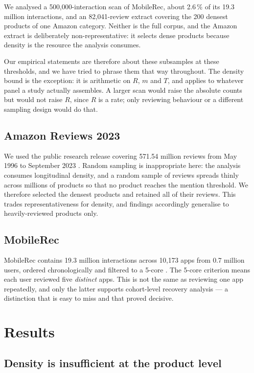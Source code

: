 \documentclass[11pt,a4paper]{article}
\makeatletter
\let\original@section\section
\renewcommand{\section}{\FloatBarrier\original@section}%
\let\original@subsection\subsection
\renewcommand{\subsection}{\FloatBarrier\original@subsection}%
\makeatother
\begin{document}
We analysed a 500{,}000-interaction scan of MobileRec, about 2.6\,\% of its
19.3 million interactions, and an 82{,}041-review extract covering the 200
densest products of one Amazon category. Neither is the full corpus, and the
Amazon extract is deliberately non-representative: it selects dense products
because density is the resource the analysis consumes.

Our empirical statements are therefore about these subsamples at these
thresholds, and we have tried to phrase them that way throughout. The density
bound is the exception: it is arithmetic on $R$, $m$ and $T$, and applies to
whatever panel a study actually assembles. A larger scan would raise the
absolute counts but would not raise $R$, since $R$ is a rate; only reviewing
behaviour or a different sampling design would do that.

\subsection{Amazon Reviews 2023}

We used the public research release covering 571.54 million reviews from May
1996 to September 2023 \citep{hou2026}. Random
sampling is inappropriate here: the analysis consumes longitudinal density,
and a random sample of reviews spreads thinly across millions of products so
that no product reaches the mention threshold. We therefore selected the
densest products and retained all of their reviews. This trades
representativeness for density, and findings accordingly generalise to
heavily-reviewed products only.

\subsection{MobileRec}

MobileRec contains 19.3 million interactions across 10{,}173 apps from
0.7 million users, ordered chronologically and filtered to a 5-core \citep{maqbool2023}. The 5-core criterion means
each user reviewed five \emph{distinct} apps. This is not the same as
reviewing one app repeatedly, and only the latter supports cohort-level
recovery analysis --- a distinction that is easy to miss and that proved
decisive.

\section{Results}
\label{sec:results}

\subsection{Density is insufficient at the product level}
\end{document}
